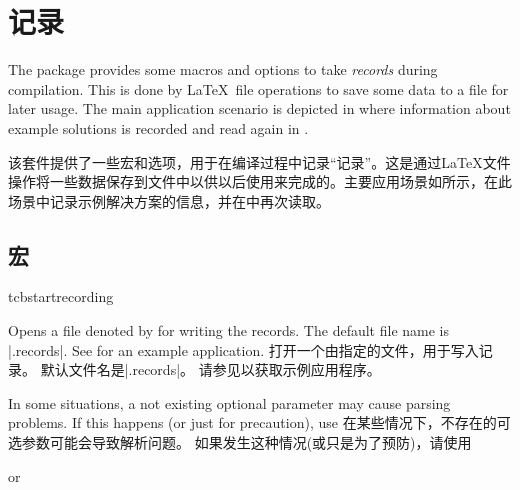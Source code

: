 \setcounter{section}{7}
\section{记录}\label{sec:recording}%
%
\begin{stripedbox}
The package provides some macros and options to take \emph{records} during compilation. 
This is done by \LaTeX\ file operations to save some data to a file for later usage. 
The main application scenario is depicted in  where information about example solutions is recorded and read again in .
\tcblower

该套件提供了一些宏和选项，用于在编译过程中记录“记录”。这是通过\LaTeX 文件操作将一些数据保存到文件中以供以后使用来完成的。主要应用场景如所示，在此场景中记录示例解决方案的信息，并在中再次读取。
\end{stripedbox}

\subsection{宏}\label{sec:recording-makros}
\begin{docCommand}[doc new=2014-11-28]{tcbstartrecording}{}
\begin{stripedbox}
Opens a file denoted by  for writing the records.
The default file name is |\jobname.records|.
See  for an example application.
\tcblower
打开一个由指定的文件，用于写入记录。 默认文件名是|\jobname.records|。 请参见以获取示例应用程序。
\end{stripedbox}

\begin{marker}
\begin{stripedbox}
In some situations, a not existing optional parameter may cause parsing problems. 
If this happens (or just for precaution), use
\tcblower
在某些情况下，不存在的可选参数可能会导致解析问题。%
如果发生这种情况(或只是为了预防)，请使用
\end{stripedbox}

\begin{dispListing}
\tcbstartrecording\relax
\end{dispListing}
  or
\begin{dispListing}
\end{dispListing}
  \end{marker}
\end{docCommand}

